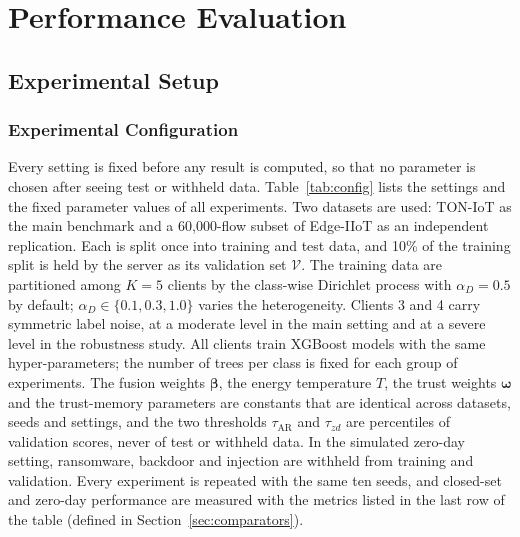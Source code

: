 \documentclass[pdflatex,sn-mathphys-num]{sn-jnl}
\begin{document}
{%
\section{Performance Evaluation}
\label{sec:evaluation}

\subsection{Experimental Setup}
{\color{black}
\subsubsection{Experimental Configuration}
Every setting is fixed before any result is computed, so that no parameter is chosen after seeing test or withheld data. Table~\ref{tab:config} lists the settings and the fixed parameter values of all experiments. Two datasets are used: TON-IoT as the main benchmark and a 60{,}000-flow subset of Edge-IIoT as an independent replication. Each is split once into training and test data, and 10\% of the training split is held by the server as its validation set $\mathcal{V}$. The training data are partitioned among $K=5$ clients by the class-wise Dirichlet process with $\alpha_D=0.5$ by default; $\alpha_D\in\{0.1,0.3,1.0\}$ varies the heterogeneity. Clients 3 and 4 carry symmetric label noise, at a moderate level in the main setting and at a severe level in the robustness study. All clients train XGBoost models with the same hyper-parameters; the number of trees per class is fixed for each group of experiments. The fusion weights $\boldsymbol\beta$, the energy temperature $T$, the trust weights $\boldsymbol\omega$ and the trust-memory parameters are constants that are identical across datasets, seeds and settings, and the two thresholds $\tau_{\mathrm{AR}}$ and $\tau_{zd}$ are percentiles of validation scores, never of test or withheld data. In the simulated zero-day setting, ransomware, backdoor and injection are withheld from training and validation. Every experiment is repeated with the same ten seeds, and closed-set and zero-day performance are measured with the metrics listed in the last row of the table (defined in Section~\ref{sec:comparators}).

}}
\end{document}
